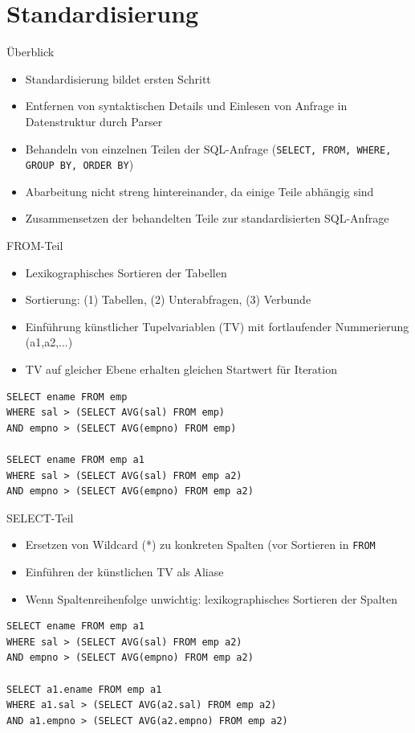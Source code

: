 \documentclass{beamer}
\begin{document}
\section{Standardisierung}

\begin{frame}[fragile]{Überblick}
\begin{itemize}
\item Standardisierung bildet ersten Schritt 
\item Entfernen von syntaktischen Details und Einlesen von Anfrage in Datenstruktur durch Parser
\item Behandeln von einzelnen Teilen der SQL-Anfrage (\verb|SELECT, FROM, WHERE, GROUP BY, ORDER BY|)
\item Abarbeitung nicht streng hintereinander, da einige Teile abhängig sind
\item Zusammensetzen der behandelten Teile zur standardisierten SQL-Anfrage
\end{itemize}
\end{frame}





\begin{frame}[fragile]{FROM-Teil}
\begin{itemize}
\item Lexikographisches Sortieren der Tabellen
\item Sortierung: (1) Tabellen, (2) Unterabfragen, (3) Verbunde
\item Einführung künstlicher Tupelvariablen (TV) mit fortlaufender Nummerierung (a1,a2,...)
\item TV auf gleicher Ebene erhalten gleichen Startwert für Iteration
\end{itemize}

\begin{verbatim}
SELECT ename FROM emp
WHERE sal > (SELECT AVG(sal) FROM emp)
AND empno > (SELECT AVG(empno) FROM emp)

SELECT ename FROM emp a1
WHERE sal > (SELECT AVG(sal) FROM emp a2)
AND empno > (SELECT AVG(empno) FROM emp a2)
\end{verbatim}
\end{frame}

\begin{frame}[fragile]{SELECT-Teil}
\begin{itemize}
\item Ersetzen von Wildcard (*) zu konkreten Spalten (vor Sortieren in \verb|FROM|
\item Einführen der künstlichen TV als Aliase
\item Wenn Spaltenreihenfolge unwichtig: lexikographisches Sortieren der Spalten
\end{itemize}

\begin{verbatim}
SELECT ename FROM emp a1
WHERE sal > (SELECT AVG(sal) FROM emp a2)
AND empno > (SELECT AVG(empno) FROM emp a2)

SELECT a1.ename FROM emp a1
WHERE a1.sal > (SELECT AVG(a2.sal) FROM emp a2)
AND a1.empno > (SELECT AVG(a2.empno) FROM emp a2)
\end{verbatim}
\end{frame}
\end{document}
